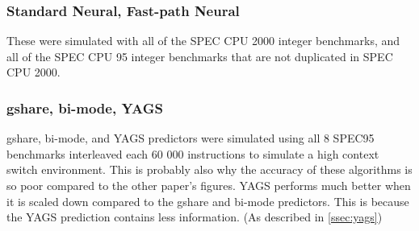 \subsubsection*{Standard Neural, Fast-path Neural}
These were simulated with all of the SPEC CPU 2000 integer benchmarks, and all of the SPEC CPU 95 integer benchmarks that are not duplicated in SPEC CPU 2000.

\subsubsection*{gshare, bi-mode, YAGS}
gshare, bi-mode, and YAGS predictors were simulated using all 8 SPEC95 benchmarks interleaved each 60 000 instructions to simulate a high context switch environment. This is probably also why the accuracy of these algorithms is so poor compared to the other paper's figures.
YAGS performs much better when it is scaled down compared to the gshare and bi-mode predictors.
This is because the YAGS prediction contains less information. (As described in \ref{ssec:yags})